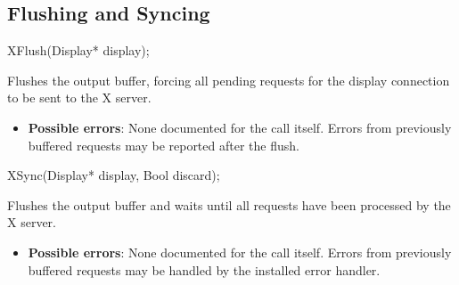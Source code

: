 \documentclass{report}
\begin{document}
    \subsection{Flushing and Syncing}
    \begin{itemize}
        \begin{cppcode}
            XFlush(Display* display);
        \end{cppcode}
        \bigbreak \noindent
        Flushes the output buffer, forcing all pending requests for the display connection to be sent to the X server.
        \begin{itemize}
            \item \textbf{Possible errors}: None documented for the call itself. Errors from previously buffered requests may be reported after the flush.
        \end{itemize}
        \begin{cppcode}
            XSync(Display* display, Bool discard);
        \end{cppcode}
        \bigbreak \noindent
        Flushes the output buffer and waits until all requests have been processed by the X server.
        \begin{itemize}
            \item \textbf{Possible errors}: None documented for the call itself. Errors from previously buffered requests may be handled by the installed error handler.
        \end{itemize}

    \end{itemize}

    \pagebreak 
\end{document}
